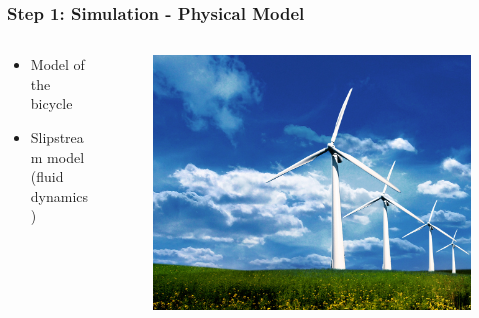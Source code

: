 \documentclass{beamer}
\begin{document}
\begin{frame}
\frametitle{Step 1: Simulation - Physical Model}

\begin{columns}
  \begin{column}{0.6\textwidth}
    \begin{itemize}
    \item Model of the bicycle
      \vspace{0.2cm}
    \item Slipstream model (fluid dynamics)
    \end{itemize}
  \end{column}

  \begin{column}{0.4\textwidth}
    \begin{figure}[ht!]
      \includegraphics[scale=0.1]{physical.jpg}
    \end{figure}
  \end{column}
\end{columns}

\end{frame}
\end{document}
